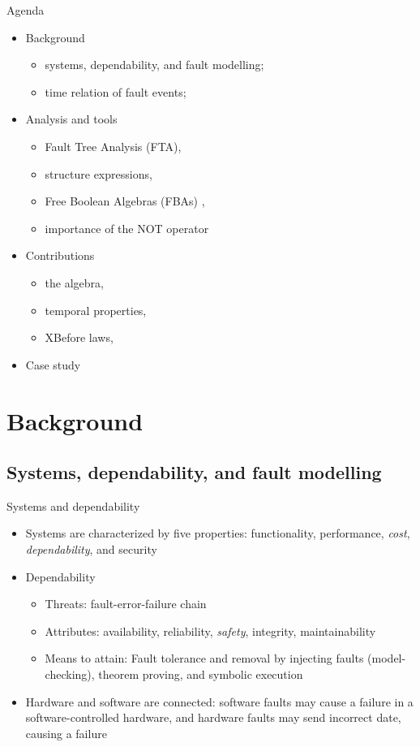 \documentclass{beamer}
\def\FTA{Fault Tree Analysis (FTA)\gdef\FTA{FTA\xspace}\xspace}
\def\FBA{%
	Free Boolean Algebra (FBA)%
	\gdef\FBA{FBA\xspace}%
	\gdef\FBAs{FBAs\xspace}%
	\gdef\iFBA{an FBA\xspace}%
	\xspace%
}
\def\FBAs{%
	Free Boolean Algebras (FBAs)%
	\gdef\FBA{FBA\xspace}%
	\gdef\FBAs{FBAs\xspace}%
	\gdef\iFBA{an FBA\xspace}%
	\xspace%
}
\def\iFBA{%
	a Free Boolean Algebra (FBA)%
	\gdef\FBA{FBA\xspace}%
	\gdef\FBAs{FBAs\xspace}%
	\gdef\iFBA{an FBA\xspace}%
	\xspace%
}
\begin{document}
\begin{frame}{Agenda}
	\begin{itemize}
		\item Background
		\begin{itemize}
			\item systems, dependability, and fault modelling; 
			\item time relation of fault events;
		\end{itemize}
		\item Analysis and tools
		\begin{itemize}
			\item \FTA, 
			\item structure expressions, 
			\item \FBAs, 
			\item importance of the NOT operator
		\end{itemize}
		\item Contributions
		\begin{itemize}
			\item the algebra, 
			\item temporal properties, 
			\item XBefore laws, 
		\end{itemize}
		\item Case study
	\end{itemize}
\end{frame}

\section{Background}

\subsection{Systems, dependability, and fault modelling}

\begin{frame}{Systems and dependability}
	\begin{itemize}
		\item Systems are characterized by five properties: functionality, performance, \emph{cost}, \emph{dependability}, and security
		\item Dependability
		\begin{itemize}
			\item Threats: fault-error-failure chain
			\item Attributes: availability, reliability, \emph{safety}, integrity, maintainability
			\item Means to attain: Fault tolerance and removal by injecting faults (model-checking), theorem proving, and symbolic execution
		\end{itemize}
		\item Hardware and software are connected: software faults may cause a failure in a software-controlled hardware, and hardware faults may send incorrect date, causing a failure
	\end{itemize}
\end{frame}
\end{document}
